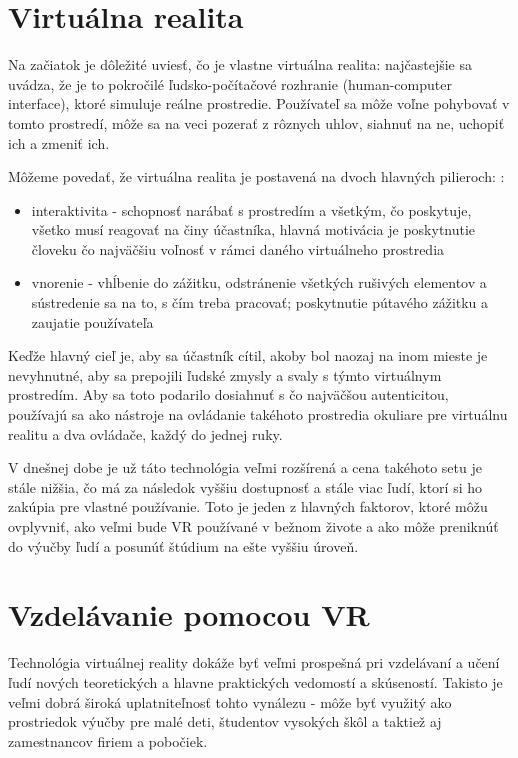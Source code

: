 \documentclass[10pt,twoside,slovak,a4paper]{article}
\begin{document}
\section{Virtuálna realita} \label{druha}

Na začiatok je dôležité uviesť, čo je vlastne virtuálna realita: najčastejšie sa uvádza,\cite{VR} že je to pokročilé ľudsko-počítačové rozhranie (human-computer interface), ktoré simuluje reálne prostredie. Používateľ sa môže voľne pohybovať v tomto prostredí, môže sa na veci pozerať z rôznych uhlov, siahnuť na ne, uchopiť ich a zmeniť ich. 

Môžeme povedať, že virtuálna realita je postavená na dvoch hlavných pilieroch: \cite{VR_kniha}:
\begin{itemize}
\item interaktivita - schopnosť narábať s prostredím a všetkým, čo poskytuje, všetko musí reagovať na činy účastníka, hlavná motivácia je poskytnutie človeku čo najväčšiu voľnosť v rámci daného virtuálneho prostredia
\item vnorenie - vhĺbenie do zážitku, odstránenie všetkých rušivých elementov a sústredenie sa na to, s čím treba pracovať; poskytnutie pútavého zážitku a zaujatie používateľa
\end{itemize}

Keďže hlavný cieľ je, aby sa účastník cítil, akoby bol naozaj na inom mieste je nevyhnutné, aby sa prepojili ľudské zmysly a svaly s týmto virtuálnym prostredím. Aby sa toto podarilo dosiahnuť s čo najväčšou autenticitou, používajú sa ako nástroje na ovládanie takéhoto prostredia okuliare pre virtuálnu realitu a dva ovládače, každý do jednej ruky. 

V dnešnej dobe je už táto technológia veľmi rozšírená a cena takéhoto setu je stále nižšia, čo má za následok vyššiu dostupnosť a stále viac ľudí, ktorí si ho zakúpia pre vlastné používanie. Toto je jeden z hlavných faktorov, ktoré môžu ovplyvniť, ako veľmi bude VR používané v bežnom živote a ako môže preniknúť do výučby ľudí a posunúť štúdium na ešte vyššiu úroveň.

\section{Vzdelávanie pomocou VR} \label{tretia}
Technológia virtuálnej reality dokáže byť veľmi prospešná pri vzdelávaní a učení ľudí nových teoretických a hlavne praktických vedomostí a skúseností. Takisto je veľmi dobrá široká uplatniteľnosť tohto vynálezu - môže byť využitý ako prostriedok výučby pre malé deti, študentov vysokých škôl a taktiež aj zamestnancov firiem a pobočiek. 
\end{document}
